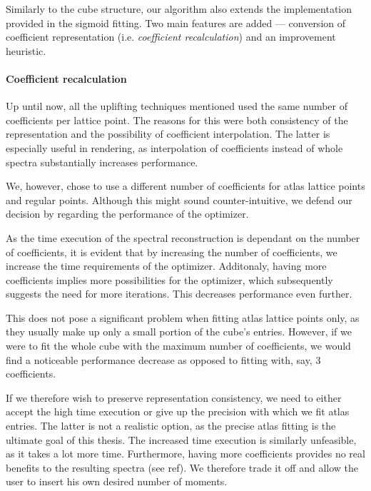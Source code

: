 Similarly to the cube structure, our algorithm also extends the implementation provided in the sigmoid fitting. Two main features are added --- conversion of coefficient representation (i.e. \emph{coefficient recalculation}) and an improvement heuristic.

\paragraph{Coefficient recalculation}

Up until now, all the uplifting techniques mentioned used the same number of coefficients per lattice point. The reasons for this were both consistency of the representation and the possibility of coefficient interpolation. The latter is especially useful in rendering, as interpolation of coefficients instead of whole spectra substantially increases performance.

We, however, chose to use a different number of coefficients for atlas lattice points and regular points. Although this might sound counter-intuitive, we defend our decision by regarding the performance of the optimizer.

As the time execution of the spectral reconstruction is dependant on the number of coefficients, it is evident that by increasing the number of coefficients, we increase the time requirements of the optimizer. Additonaly, having more coefficients implies more possibilities for the optimizer, which subsequently suggests the need for more iterations. This decreases performance even further.

This does not pose a significant problem when fitting atlas lattice points only, as they usually make up only a small portion of the cube's entries. However, if we were to fit the whole cube with the maximum number of coefficients, we would find a noticeable performance decrease as opposed to fitting with, say, 3 coefficients.

If we therefore wish to preserve representation consistency, we need to either accept the high time execution or give up the precision with which we fit atlas entries. The latter is not a realistic option, as the precise atlas fitting is the ultimate goal of this thesis. The increased time execution is similarly unfeasible, as it takes a lot more time. Furthermore, having more coefficients provides no real benefits to the resulting spectra (see ref). We therefore trade it off and allow the user to insert his own desired number of moments.

